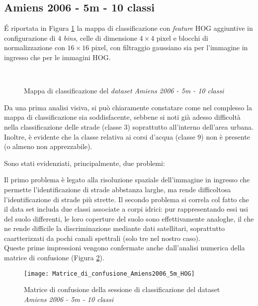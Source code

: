 \subsection{Amiens 2006 - 5m - 10 classi}

\'E riportata in Figura \ref{fig:ClassMap_Amiens2006_5m} la mappa di
classificazione con \emph{feature} HOG aggiuntive in configurazione di
$4$ \emph{bins}, celle di dimensione $4\times4$ pixel e blocchi di
normalizzazione con $16\times16$ pixel, con filtraggio gaussiano sia
per l'immagine in ingresso che per le immagini HOG.

\begin{figure}[!ht]
\center
{}
\\

\caption{Mappa di classificazione del \emph{dataset} \emph{Amiens 2006 - 5m - 10 classi}}

\label{fig:ClassMap_Amiens2006_5m}

\end{figure}

Da una prima analisi visiva, si può chiaramente constatare come nel
complesso la mappa di classificazione sia soddisfacente, sebbene si
noti già adesso difficoltà nella classificazione delle strade (classe
3) soprattutto all'interno dell'area urbana. Inoltre, è evidente che
la classe relativa ai corsi d'acqua (classe 9) non è presente (o
almeno non apprezzabile).

Sono stati evidenziati, principalmente, due problemi:

Il primo problema è legato alla risoluzione spaziale dell'immagine in
ingresso che permette l'identificazione di strade abbstanza larghe, ma
rende difficoltosa l'identificazione di strade più strette. Il secondo
problema si correla col fatto che il data set includa due classi
associate a corpi idrici: pur rappresentando essi usi del suolo
differenti, le loro coperture del suolo sono effettivamente analoghe,
il che ne rende difficile la discriminazione mediante dati
satellitari, soprattutto caartterizzati da pochi canali spettrali
(solo tre nel nostro caso).\\

Queste prime impressioni vengono confermate anche dall'analisi
numerica della matrice di confusione (Figura
\ref{fig:Matrice_di_confusione_Amiens2006_5m_HOG}).

\begin{figure}[!ht]

\texttt{[image: Matrice\_di\_confusione\_Amiens2006\_5m\_HOG]}

\caption{Matrice di confusione della sessione di classificazione del
dataset \emph{Amiens 2006 - 5m - 10 classi}}

\label{fig:Matrice_di_confusione_Amiens2006_5m_HOG}

\end{figure}

